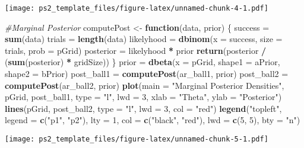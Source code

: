 \documentclass[
]{article}
\newenvironment{Shaded}{\begin{snugshade}}{\end{snugshade}}
\newcommand{\AttributeTok}[1]{\textcolor[rgb]{0.13,0.29,0.53}{#1}}
\newcommand{\CommentTok}[1]{\textcolor[rgb]{0.56,0.35,0.01}{\textit{#1}}}
\newcommand{\ControlFlowTok}[1]{\textcolor[rgb]{0.13,0.29,0.53}{\textbf{#1}}}
\newcommand{\DecValTok}[1]{\textcolor[rgb]{0.00,0.00,0.81}{#1}}
\newcommand{\FunctionTok}[1]{\textcolor[rgb]{0.13,0.29,0.53}{\textbf{#1}}}
\newcommand{\NormalTok}[1]{#1}
\newcommand{\OtherTok}[1]{\textcolor[rgb]{0.56,0.35,0.01}{#1}}
\newcommand{\SpecialCharTok}[1]{\textcolor[rgb]{0.81,0.36,0.00}{\textbf{#1}}}
\newcommand{\StringTok}[1]{\textcolor[rgb]{0.31,0.60,0.02}{#1}}
\begin{document}
\texttt{[image: ps2\_template\_files/figure-latex/unnamed-chunk-4-1.pdf]}

\begin{Shaded}
\begin{Highlighting}[]
\CommentTok{\#Marginal Posterior}
\NormalTok{computePost }\OtherTok{\textless{}{-}} \ControlFlowTok{function}\NormalTok{(data, prior) \{}
\NormalTok{  success }\OtherTok{=} \FunctionTok{sum}\NormalTok{(data)}
\NormalTok{  trials }\OtherTok{=} \FunctionTok{length}\NormalTok{(data)}
\NormalTok{  likelyhood }\OtherTok{=} \FunctionTok{dbinom}\NormalTok{(}\AttributeTok{x =}\NormalTok{ success, }\AttributeTok{size =}\NormalTok{ trials, }\AttributeTok{prob =}\NormalTok{ pGrid)}
\NormalTok{  posterior }\OtherTok{=}\NormalTok{ likelyhood }\SpecialCharTok{*}\NormalTok{ prior}
  \FunctionTok{return}\NormalTok{(posterior }\SpecialCharTok{/}\NormalTok{ (}\FunctionTok{sum}\NormalTok{(posterior) }\SpecialCharTok{*}\NormalTok{ gridSize))}
\NormalTok{\}}
\NormalTok{prior }\OtherTok{=} \FunctionTok{dbeta}\NormalTok{(}\AttributeTok{x =}\NormalTok{ pGrid, }\AttributeTok{shape1 =}\NormalTok{ aPrior, }\AttributeTok{shape2 =}\NormalTok{ bPrior)}
\NormalTok{post\_ball1 }\OtherTok{=} \FunctionTok{computePost}\NormalTok{(ar\_ball1, prior)}
\NormalTok{post\_ball2 }\OtherTok{=} \FunctionTok{computePost}\NormalTok{(ar\_ball2, prior)}
\FunctionTok{plot}\NormalTok{(}\AttributeTok{main =} \StringTok{"Marginal Posterior Densities"}\NormalTok{, pGrid, post\_ball1, }
     \AttributeTok{type =} \StringTok{"l"}\NormalTok{, }\AttributeTok{lwd =} \DecValTok{3}\NormalTok{, }\AttributeTok{xlab =} \StringTok{"Theta"}\NormalTok{, }\AttributeTok{ylab =} \StringTok{"Posterior"}\NormalTok{)}
\FunctionTok{lines}\NormalTok{(pGrid, post\_ball2, }\AttributeTok{type =} \StringTok{"l"}\NormalTok{, }\AttributeTok{lwd =} \DecValTok{3}\NormalTok{, }\AttributeTok{col =} \StringTok{"red"}\NormalTok{)}
\FunctionTok{legend}\NormalTok{(}\StringTok{"topleft"}\NormalTok{, }\AttributeTok{legend =} \FunctionTok{c}\NormalTok{(}\StringTok{"p1"}\NormalTok{, }\StringTok{"p2"}\NormalTok{), }\AttributeTok{lty =} \DecValTok{1}\NormalTok{, }
       \AttributeTok{col =} \FunctionTok{c}\NormalTok{(}\StringTok{"black"}\NormalTok{, }\StringTok{"red"}\NormalTok{), }\AttributeTok{lwd =} \FunctionTok{c}\NormalTok{(}\DecValTok{5}\NormalTok{, }\DecValTok{5}\NormalTok{), }\AttributeTok{bty =} \StringTok{"n"}\NormalTok{)}
\end{Highlighting}
\end{Shaded}

\texttt{[image: ps2\_template\_files/figure-latex/unnamed-chunk-5-1.pdf]}
\end{document}
